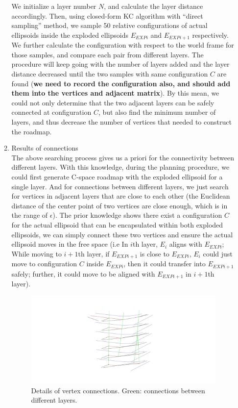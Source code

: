 \documentclass{article}
\begin{document}
\begin{enumerate}
\begin{enumerate}
We initialize a layer number $N$, and calculate the layer distance accordingly. Then,  using closed-form KC algorithm with ``direct sampling'' method, we sample 50 relative configurations of actual ellipsoids inside the exploded ellipsoids $E_{EXPi}$ and $E_{EXPi+1}$ respectively. We further calculate the configuration with respect to the world frame for those samples, and compare each pair from different layers. The procedure will keep going with the number of layers added and the layer distance decreased until the two samples with same configuration $C$ are found ({\bf we need to record the configuration also, and should add them into the vertices and adjacent matrix}). By this mean, we could not only determine that the two adjacent layers can be safely connected at configuration $C$, but also find the minimum number of layers, and thus decrease the number of vertices that needed to construct the roadmap.
	
\item Results of connections\\
The above searching process gives us a priori for the connectivity between different layers. With this knowledge, during the planning procedure, we could first generate C-space roadmap with the exploded ellipsoid for a single layer. And for connections between different layers, we just search for vertices in adjacent layers that are close to each other (the Euclidean distance of the center point of two vertices are close enough, which is in the range of $\epsilon$). The prior knowledge shows there exist a configuration $C$ for the actual ellipsoid that can be encapsulated within both exploded ellipsoids, we can simply connect these two vertices and ensure the actual ellipsoid moves in the free space (i.e In $i$th layer, $E_i$ aligns with $E_{EXPi}$; While moving to $i+1$th layer, if $E_{EXPi+1}$ is close to $E_{EXPi}$, $E_i$ could just move to configuration $C$ inside $E_{EXPi}$, then it could transfer into $E_{EXPi+1}$ safely; further, it could move to be aligned with $E_{EXPi+1}$ in $i+1$th layer).
	
\begin{figure}
\centering
\includegraphics[scale = 0.2]{layerConnection_zoomIn.jpg}
\caption{Details of vertex connections. Green: connections between different layers.}
\label{fig:path_zoomIn}
\end{figure}
	

\end{enumerate}
\end{enumerate}
\end{document}
